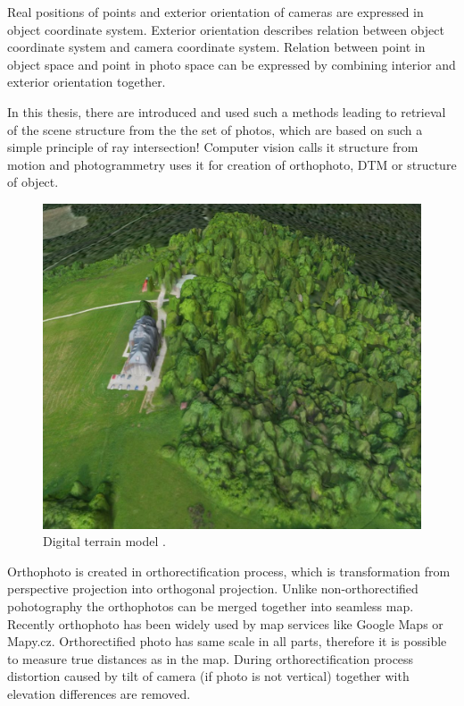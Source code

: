 \documentclass[a4paper,12pt]{article}
\begin{document}
Real positions of points and exterior orientation of cameras are expressed in object coordinate system. 
Exterior orientation describes relation between object coordinate system and camera coordinate system. 
Relation between point in object 
space and point in photo space can be expressed by combining interior and exterior orientation together.

In this thesis, there are introduced and used such a methods leading to retrieval of the scene structure from the 
the set of photos, which are based on such a simple principle of ray intersection! Computer vision calls it structure from motion 
and photogrammetry uses it for creation of orthophoto, DTM or structure of object.


\begin{figure}[h]
    \centering
    \includegraphics[scale=0.3]{figures/dtm.jpg}
    \caption{Digital terrain model \cite{kbosak2010bezmiechowa}.}
\end{figure}


Orthophoto is created in 
orthorectification process, which is transformation from perspective projection into orthogonal projection.
Unlike non-orthorectified pohotography the orthophotos can be merged together into seamless map. Recently 
orthophoto has been widely used by map services like Google Maps or Mapy.cz. Ortho\-rectified photo 
has same scale in all parts, therefore it is possible to measure true distances as in the map. During orthorectification process distortion 
caused by tilt of camera (if photo is not vertical) together with elevation differences are removed.
\end{document}

